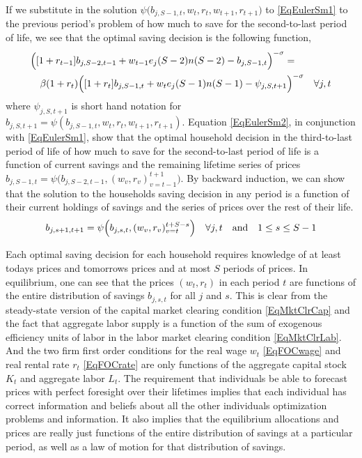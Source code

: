 \documentclass[letterpaper,12pt]{article}
\theoremstyle{definition}
\begin{document}
\begin{spacing}{1.5}
    If we substitute in the solution $\psi\bigl(b_{j,S-1,t},w_t,r_t,w_{t+1},r_{t+1}\bigr)$ to \eqref{EqEulerSm1} to the previous period's problem of how much to save for the second-to-last period of life, we see that the optimal saving decision is the following function,
    \begin{equation}\label{EqEulerSm2}
      \begin{split}
        &\Bigl([1+r_{t-1}]b_{j,S-2,t-1} + w_{t-1} e_j(S-2)n(S-2) - b_{j,S-1,t}\Bigr)^{-\sigma} = \\
        &\quad \beta(1+r_t)\Bigl([1+r_t]b_{j,S-1,t} + w_{t}e_j(S-1)n(S-1) - \psi_{j,S,t+1}\Bigr)^{-\sigma} \quad\forall j,t
      \end{split}
    \end{equation}
    where $\psi_{j,S,t+1}$ is short hand notation for $b_{j,S,t+1}=\psi(b_{j,S-1,t},w_t,r_t,w_{t+1},r_{t+1})$. Equation \eqref{EqEulerSm2}, in conjunction with \eqref{EqEulerSm1}, show that the optimal household decision in the third-to-last period of life of how much to save for the second-to-last period of life is a function of current savings and the remaining lifetime series of prices $b_{j,S-1,t}=\psi\bigl(b_{j,S-2,t-1},(w_v,r_v)_{v=t-1}^{t+1}\bigr)$. By backward induction, we can show that the solution to the households saving decision in any period is a function of their current holdings of savings and the series of prices over the rest of their life.
    \begin{equation}\label{EqPsiGen}
      b_{j,s+1,t+1} = \psi\Bigl(b_{j,s,t},(w_v,r_v)_{v=t}^{t+S-s}\Bigr) \quad\forall j,t \quad\text{and}\quad 1\leq s\leq S-1
    \end{equation}

    Each optimal saving decision for each household requires knowledge of at least todays prices and tomorrows prices and at most $S$ periods of prices. In equilibrium, one can see that the prices $(w_t,r_t)$ in each period $t$ are functions of the entire distribution of savings $b_{j,s,t}$ for all $j$ and $s$. This is clear from the steady-state version of the capital market clearing condition \eqref{EqMktClrCap} and the fact that aggregate labor supply is a function of the sum of exogenous efficiency units of labor in the labor market clearing condition \eqref{EqMktClrLab}. And the two firm first order conditions for the real wage $w_t$ \eqref{EqFOCwage} and real rental rate $r_t$ \eqref{EqFOCrate} are only functions of the aggregate capital stock $K_t$ and aggregate labor $L_t$. The requirement that individuals be able to forecast prices with perfect foresight over their lifetimes implies that each individual has correct information and beliefs about all the other individuals optimization problems and information. It also implies that the equilibrium allocations and prices are really just functions of the entire distribution of savings at a particular period, as well as a law of motion for that distribution of savings.


\end{spacing}
\end{document}
